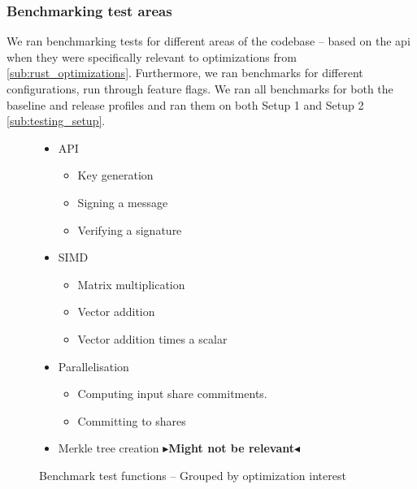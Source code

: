 \documentclass[twoside,11pt]{report}
\theoremstyle{definition}
\theoremstyle{plain}
\newcommand{\todo}[1]{{\color[rgb]{.5,0,0}\textbf{$\blacktriangleright$#1$\blacktriangleleft$}}}
\begin{document}
\subsubsection{Benchmarking test areas}\label{sub:bench_test_areas}

We ran benchmarking tests for different areas of the codebase -- based on the api when they were specifically relevant to optimizations from \autoref{sub:rust_optimizations}. Furthermore, we ran benchmarks for different configurations, run through feature flags. We ran all benchmarks for both the baseline and release profiles and ran them on both Setup 1 and Setup 2 \autoref{sub:testing_setup}.

\begin{figure}
  \begin{itemize}
    \item API
          \begin{itemize}
            \item Key generation
            \item Signing a message 
            \item Verifying a signature
          \end{itemize}
    \item SIMD
          \begin{itemize}
            \item Matrix multiplication
            \item Vector addition
            \item Vector addition times a scalar
          \end{itemize}
    \item Parallelisation
          \begin{itemize}
            \item Computing input share commitments.
            \item Committing to shares
          \end{itemize}
    \item Merkle tree creation \todo{Might not be relevant}
  \end{itemize}
  \caption{Benchmark test functions -- Grouped by optimization interest}\label{fig:bench_test_functions}
\end{figure}
\end{document}
